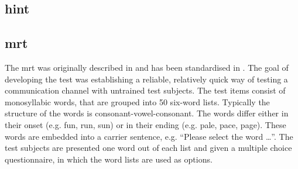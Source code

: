 \subsection{\gls{hint}}\label{ssec:hint}
\subsection{\gls{mrt}}\label{ssec:mrt}
The \gls{mrt} was originally described in \citep{mrt_63} and has been standardised in \citep{ansi_2.3}. The goal of developing the test was establishing a reliable, relatively quick way of testing a communication channel with untrained test subjects.
The test items consist of monosyllabic words, that are grouped into 50 six-word lists. Typically the structure of the words is consonant-vowel-consonant. The words differ either in their onset (e.g. fun, run, sun) or in their ending (e.g. pale, pace, page). 
These words are embedded into a carrier sentence, e.g. \enquote{Please select the word \dots}. 
The test subjects are presented one word out of each list and given a multiple choice questionnaire, in which the word lists are used as options.
